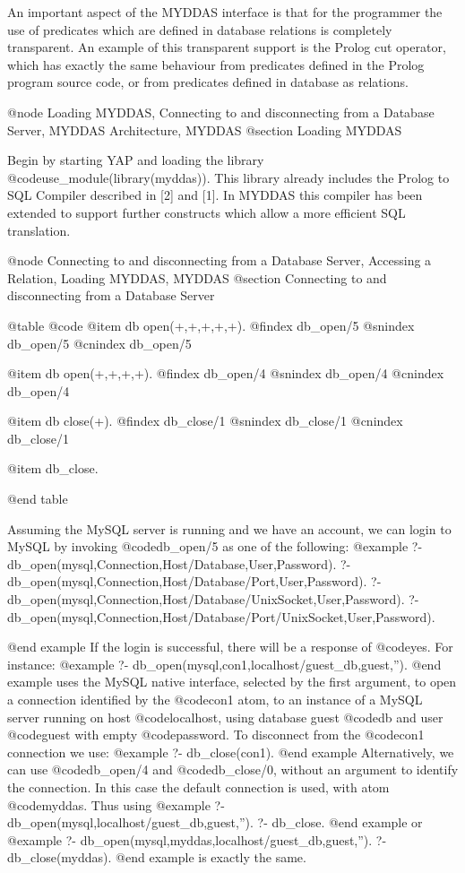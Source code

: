{{{{{{{{{An important aspect of the MYDDAS interface is that for the programmer
the use of predicates which are defined in database relations is
completely transparent. An example of this transparent support is the
Prolog cut operator, which has exactly the same behaviour from
predicates defined in the Prolog program source code, or from predicates
defined in database as relations.

@node Loading MYDDAS, Connecting to and disconnecting from a Database Server, MYDDAS Architecture, MYDDAS 
@section Loading MYDDAS

Begin by starting YAP and loading the library
@code{use_module(library(myddas))}.  This library already includes the
Prolog to SQL Compiler described in [2] and [1]. In MYDDAS this compiler
has been extended to support further constructs which allow a more
efficient SQL translation.  

@node Connecting to and disconnecting from a Database Server, Accessing a Relation, Loading MYDDAS, MYDDAS
@section Connecting to and disconnecting from a Database Server


@table @code
@item db open(+,+,+,+,+). 
@findex db_open/5
@snindex db_open/5
@cnindex db_open/5

@item db open(+,+,+,+). 
@findex db_open/4
@snindex db_open/4
@cnindex db_open/4

@item db close(+). 
@findex db_close/1
@snindex db_close/1
@cnindex db_close/1

@item db_close.

@end table 

  Assuming the MySQL server is running and we have an account, we can
login to MySQL by invoking @code{db_open/5} as one of the following:
@example
?- db_open(mysql,Connection,Host/Database,User,Password). 
?- db_open(mysql,Connection,Host/Database/Port,User,Password).
?- db_open(mysql,Connection,Host/Database/UnixSocket,User,Password). 
?- db_open(mysql,Connection,Host/Database/Port/UnixSocket,User,Password).

@end example
If the login is successful, there will be a response of @code{yes}. For
instance:
 @example
?- db_open(mysql,con1,localhost/guest_db,guest,'').
@end example
uses the MySQL native interface, selected by the first argument, to open
a connection identified by the @code{con1} atom, to an instance of a
MySQL server running on host @code{localhost}, using database guest @code{db}
and user @code{guest} with empty @code{password}.  To disconnect from the @code{con1}
connection we use: 
@example
?- db_close(con1).
@end example
 Alternatively, we can use @code{db_open/4} and @code{db_close/0,} without an argument
to identify the connection. In this case the default connection is used,
with atom @code{myddas}. Thus using 
@example
?- db_open(mysql,localhost/guest_db,guest,''). 
?- db_close.  
@end example
or
@example
?- db_open(mysql,myddas,localhost/guest_db,guest,''). 
?- db_close(myddas). 
@end example
is exactly the same.

}}}}}}}}}
